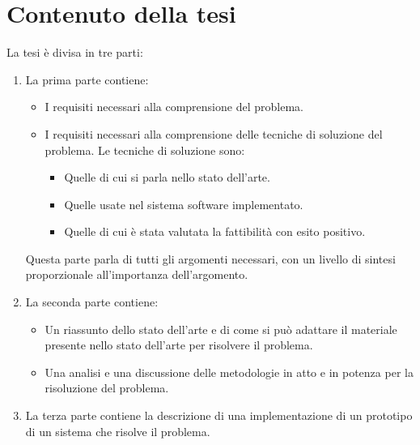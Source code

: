 \section{Contenuto della tesi}

La tesi \`e divisa in tre parti: 
\begin{enumerate}
  \item
    La prima parte contiene:
    \begin{itemize}
      \item
	I requisiti necessari alla comprensione del problema.
      \item
	I requisiti necessari alla comprensione delle tecniche di soluzione del problema. Le tecniche di soluzione sono: 
	\begin{itemize}
	  \item
	    Quelle di cui si parla nello stato dell'arte.
	  \item
	    Quelle usate nel sistema software implementato. 
	  \item
	    Quelle di cui \`e stata valutata la fattibilit\`a con esito positivo. 
	\end{itemize}
    \end{itemize}
    Questa parte parla di tutti gli argomenti necessari, con un livello di sintesi proporzionale all'importanza dell'argomento.
  \item
    La seconda parte contiene: 
    \begin{itemize}
      \item
	Un riassunto dello stato dell'arte e di come si pu\`o adattare il materiale presente nello stato dell'arte per risolvere il problema.
      \item
	Una analisi e una discussione delle metodologie in atto e in potenza per la risoluzione del problema.
    \end{itemize}
  \item
    La terza parte contiene la descrizione di una implementazione di un prototipo di un sistema che risolve il problema.
\end{enumerate}